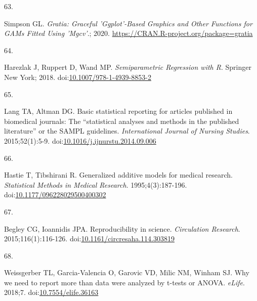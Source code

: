 \documentclass[
]{article}
\newlength{\cslhangindent}
\newlength{\csllabelwidth}
\newlength{\cslentryspacingunit} %
\newenvironment{CSLReferences}[2] %
 {%
  \setlength{\parindent}{0pt}
  \ifodd #1
  \let\oldpar\par
  \def\par{\hangindent=\cslhangindent\oldpar}
  \fi
  \setlength{\parskip}{#2\cslentryspacingunit}
 }%
 {}
\newcommand{\CSLLeftMargin}[1]{\parbox[t]{\csllabelwidth}{#1}}
\newcommand{\CSLRightInline}[1]{\parbox[t]{\linewidth - \csllabelwidth}{#1}\break}
\begin{document}
\begin{CSLReferences}{0}{0}
\leavevmode{}%
\CSLLeftMargin{63. }
\CSLRightInline{Simpson GL. \emph{Gratia: Graceful 'Ggplot'-Based Graphics and Other Functions for GAMs Fitted Using 'Mgcv'}.; 2020. \url{https://CRAN.R-project.org/package=gratia}}

\leavevmode{}%
\CSLLeftMargin{64. }
\CSLRightInline{Harezlak J, Ruppert D, Wand MP. \emph{Semiparametric Regression with {R}}. Springer New York; 2018. doi:\href{https://doi.org/10.1007/978-1-4939-8853-2}{10.1007/978-1-4939-8853-2}}

\leavevmode{}%
\CSLLeftMargin{65. }
\CSLRightInline{Lang TA, Altman DG. Basic statistical reporting for articles published in biomedical journals: The {``}statistical analyses and methods in the published literature{''} or the {SAMPL} guidelines. \emph{International Journal of Nursing Studies}. 2015;52(1):5-9. doi:\href{https://doi.org/10.1016/j.ijnurstu.2014.09.006}{10.1016/j.ijnurstu.2014.09.006}}

\leavevmode{}%
\CSLLeftMargin{66. }
\CSLRightInline{Hastie T, Tibshirani R. Generalized additive models for medical research. \emph{Statistical Methods in Medical Research}. 1995;4(3):187-196. doi:\href{https://doi.org/10.1177/096228029500400302}{10.1177/096228029500400302}}

\leavevmode{}%
\CSLLeftMargin{67. }
\CSLRightInline{Begley CG, Ioannidis JPA. Reproducibility in science. \emph{Circulation Research}. 2015;116(1):116-126. doi:\href{https://doi.org/10.1161/circresaha.114.303819}{10.1161/circresaha.114.303819}}

\leavevmode{}%
\CSLLeftMargin{68. }
\CSLRightInline{Weissgerber TL, Garcia-Valencia O, Garovic VD, Milic NM, Winham SJ. Why we need to report more than {\textquotesingle}data were analyzed by t-tests or {ANOVA}{\textquotesingle}. \emph{{eLife}}. 2018;7. doi:\href{https://doi.org/10.7554/elife.36163}{10.7554/elife.36163}}

\end{CSLReferences}
\end{document}
